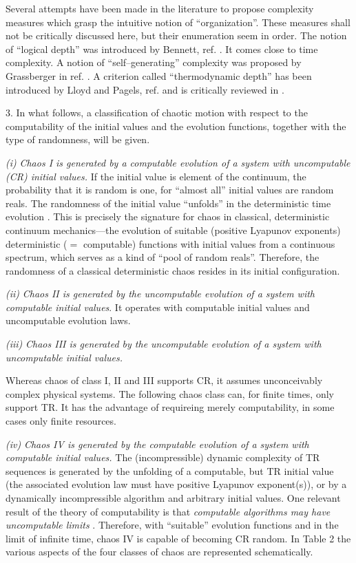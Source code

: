 Several attempts have been made in the literature to propose
complexity
measures which grasp the intuitive notion of ``organization''.
These measures shall not be critically discussed here, but their
enumeration seem in order.
The notion of ``logical depth'' was introduced by Bennett, ref.
\cite{bennett1}. It comes close to time complexity.
A notion of ``self--generating'' complexity was proposed by Grassberger
in ref. \cite{grassberger3}.
A criterion called ``thermodynamic depth'' has been introduced
by Lloyd and Pagels, ref. \cite{pagels} and is critically reviewed in
\cite{svozil1}.

3.
In what follows, a classification of chaotic motion with respect to the
computability of the initial values and the evolution functions,
together with the type of randomness, will be given.


{\it (i)}
{\sl Chaos I is generated by a computable evolution of a system with
uncomputable (CR) initial values.}
If the initial value is element of the continuum, the probability that
it is random is one, for ``almost all'' initial values are random
reals. The randomness of the
initial value ``unfolds'' in the deterministic time evolution \cite{1}.
This is precisely the signature for chaos in classical, deterministic
continuum mechanics---the
evolution of suitable (positive Lyapunov
exponents)
deterministic ($=$ computable) functions with initial values from a
continuous spectrum, which serves as a kind of ``pool of random reals''.
Therefore, the randomness of a classical deterministic chaos resides in
its initial configuration.

{\it (ii)}
{\sl Chaos II is generated by the uncomputable evolution of a system
with computable initial values}.
It operates with computable initial values and uncomputable
evolution laws.

{\it (iii)}
{\sl Chaos III is generated by the uncomputable evolution of a system
with uncomputable initial values.}

Whereas chaos of class I, II and III supports CR,
it assumes unconceivably complex physical systems.
The following chaos class can, for finite times, only support
TR. It has
the advantage of requireing merely computability, in some cases
only finite resources.

{\it (iv)}
{\sl Chaos IV is generated by the computable evolution of a system with
computable initial values.}
The (incompressible) dynamic complexity of TR sequences is
generated by the unfolding of a computable, but TR initial value
(the associated evolution law must have positive Lyapunov exponent(s)),
or by a dynamically incompressible algorithm and arbitrary initial
values.
One relevant result of the theory of computability is that
{\sl computable algorithms may
have uncomputable limits} \cite{rogers1}.
Therefore, with ``suitable'' evolution functions and in the limit of
infinite time, chaos IV is capable of becoming CR random.
In Table 2 the various aspects of the four classes of chaos are
represented schematically.

